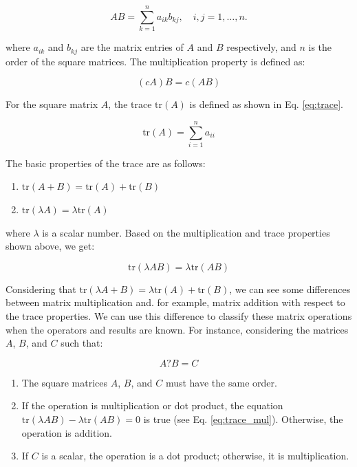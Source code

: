 \documentclass[manuscript,screen,review]{acmart}
\begin{document}
\begin{equation}
	AB = \sum_{k=1}^{n} a_{ik} b_{kj}, \quad i, j = 1, \ldots, n.
	\label{eq:mul}
\end{equation}

where \(a_{ik}\) and \(b_{kj}\) are the matrix entries of \(A\) and \(B\) respectively, and \(n\) is the order of the square matrices. The multiplication property is defined as:

\begin{equation}
	 (cA)B = c(AB)
\end{equation}

For the square matrix \(A\), the trace \(\text{tr}(A)\) is defined as shown in Eq. \eqref{eq:trace}.

\begin{equation}
	\text{tr}(A) = \sum_{i=1}^{n} a_{ii}
	\label{eq:trace}
\end{equation}

The basic properties of the trace are as follows:
\begin{enumerate}
	\item \(\text{tr}(A+B) = \text{tr}(A) + \text{tr}(B)\)
	\item \(\text{tr}(\lambda A) = \lambda \text{tr}(A)\)
\end{enumerate}

where \(\lambda\) is a scalar number. Based on the multiplication and trace properties shown above, we get:

\begin{equation}
	\text{tr}(\lambda AB) = \lambda \text{tr}(AB)
	\label{eq:trace_mul}
\end{equation}

Considering that \(\text{tr}(\lambda A + B) = \lambda \text{tr}(A) + \text{tr}(B)\), we can see some differences between matrix multiplication and. for example, matrix addition with respect to the trace properties. We can use this difference to classify these matrix operations when the operators and results are known. For instance, considering the matrices \(A\), \(B\), and \(C\) such that:

\begin{equation}
	A ? B = C
	\label{eq:operation}
\end{equation}

\begin{enumerate}
	\item The square matrices \(A\), \(B\), and \(C\) must have the same order.
	\item If the operation is multiplication or dot product, the equation \(\text{tr}(\lambda AB) - \lambda \text{tr}(AB) = 0\) is true (see Eq. \eqref{eq:trace_mul}). Otherwise, the operation is addition.
	\item If \(C\) is a scalar, the operation is a dot product; otherwise, it is multiplication.
\end{enumerate}
\end{document}
